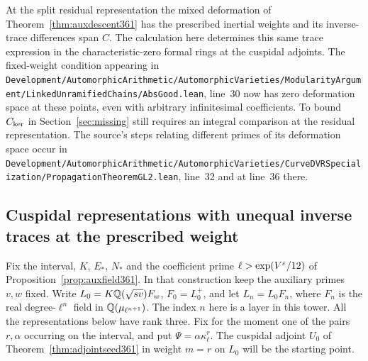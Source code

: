 \documentclass[a4paper,11pt]{article}
\theoremstyle{definition}
\theoremstyle{remark}
\newcommand{\srcloc}[2]{{\small\nolinkurl{#1.lean}}, line~#2}
\numberwithin{equation}{section}
\begin{document}
At the split residual representation the mixed deformation of
Theorem~\ref{thm:auxdescent361} has the prescribed inertial
weights and its inverse-trace differences span \(C\).
The calculation here determines this same trace expression
in the characteristic-zero formal rings at the cuspidal
adjoints. The fixed-weight condition appearing in
\srcloc{Development/AutomorphicArithmetic/AutomorphicVarieties/ModularityArgument/LinkedUnramifiedChains/AbsGood}{30}
now has zero deformation space at these points, even with
arbitrary infinitesimal coefficients. To bound \(C_{\rm ker}\)
in Section~\ref{sec:missing} still requires an integral
comparison at the residual representation. The source's steps
relating different primes of its deformation space occur in
\srcloc{Development/AutomorphicArithmetic/AutomorphicVarieties/CurveDVRSpecialization/PropagationTheoremGL2}{32}
and at line~36 there.


\subsection{Cuspidal representations with unequal inverse traces at the prescribed weight}
\label{sec:ordinaryfamily363}

Fix the interval, \(K\), \(E_*\), \(N_*\) and the coefficient prime
\(\ell>\exp(V^\varepsilon/12)\) of Proposition~\ref{prop:auxfield361}.
In that construction keep the auxiliary primes \(v,w\) fixed.
Write \(L_0=K\mathbb Q(\sqrt{sv})F_w\), \(F_0=L_0^+\), and let
\(L_n=L_0F_n\), where \(F_n\) is the real degree-\(\ell^n\) field
in \(\mathbb Q(\mu_{\ell^{n+1}})\). The index \(n\) here is a layer in this
tower. All the representations below have rank three. Fix for
the moment one of the pairs \(r,\alpha\) occurring on the interval,
and put \(\Psi=\alpha\kappa_\ell^r\).
The cuspidal adjoint \(U_0\) of
Theorem~\ref{thm:adjointseed361} in weight \(m=r\) on \(L_0\)
will be the starting point.
\end{document}
